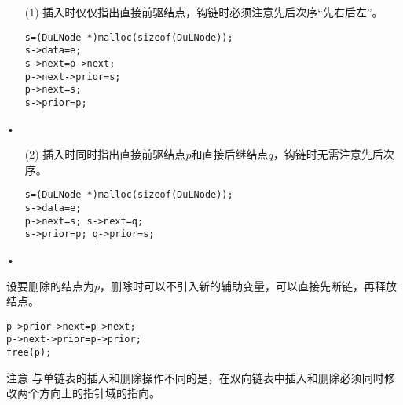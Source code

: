\begin{frame}[fragile]
\begin{itemize}
\item[(1)] 插入时仅仅指出直接前驱结点，钩链时必须注意先后次序“先右后左”。
\begin{lstlisting}[frame=none]
s=(DuLNode *)malloc(sizeof(DuLNode));
s->data=e;
s->next=p->next;
p->next->prior=s;
p->next=s;
s->prior=p;
\end{lstlisting}

\end{itemize}•

\end{frame}


\begin{frame}[fragile]
\begin{itemize}
\item[(2)] 插入时同时指出直接前驱结点$p$和直接后继结点$q$，钩链时无需注意先后次序。
\begin{lstlisting}[frame=none]
s=(DuLNode *)malloc(sizeof(DuLNode));
s->data=e;
p->next=s; s->next=q;
s->prior=p; q->prior=s;
\end{lstlisting}

\end{itemize}•

\end{frame}


\begin{frame}[fragile]
设要删除的结点为$p$，删除时可以不引入新的辅助变量，可以直接先断链，再释放结点。
\begin{lstlisting}[frame=none]
p->prior->next=p->next;
p->next->prior=p->prior;
free(p);
\end{lstlisting}
\pause

\begin{block}{注意}
与单链表的插入和删除操作不同的是，在双向链表中插入和删除必须同时修改两个方向上的指针域的指向。
\end{block}

\end{frame}